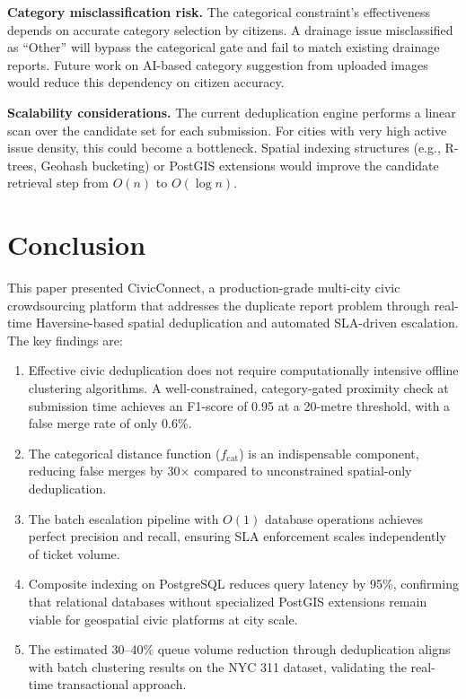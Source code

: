 \documentclass[conference]{IEEEtran}
\begin{document}
\textbf{Category misclassification risk.} The categorical constraint's effectiveness depends on accurate category selection by citizens. A drainage issue misclassified as ``Other'' will bypass the categorical gate and fail to match existing drainage reports. Future work on AI-based category suggestion from uploaded images would reduce this dependency on citizen accuracy.

\textbf{Scalability considerations.} The current deduplication engine performs a linear scan over the candidate set for each submission. For cities with very high active issue density, this could become a bottleneck. Spatial indexing structures (e.g., R-trees, Geohash bucketing) or PostGIS extensions would improve the candidate retrieval step from $O(n)$ to $O(\log n)$.

\section{Conclusion}

This paper presented CivicConnect, a production-grade multi-city civic crowdsourcing platform that addresses the duplicate report problem through real-time Haversine-based spatial deduplication and automated SLA-driven escalation. The key findings are:

\begin{enumerate}
\item Effective civic deduplication does not require computationally intensive offline clustering algorithms. A well-constrained, category-gated proximity check at submission time achieves an F1-score of 0.95 at a 20-metre threshold, with a false merge rate of only 0.6\%.
\item The categorical distance function ($f_{\text{cat}}$) is an indispensable component, reducing false merges by 30$\times$ compared to unconstrained spatial-only deduplication.
\item The batch escalation pipeline with $O(1)$ database operations achieves perfect precision and recall, ensuring SLA enforcement scales independently of ticket volume.
\item Composite indexing on PostgreSQL reduces query latency by 95\%, confirming that relational databases without specialized PostGIS extensions remain viable for geospatial civic platforms at city scale.
\item The estimated 30--40\% queue volume reduction through deduplication aligns with batch clustering results on the NYC 311 dataset, validating the real-time transactional approach.
\end{enumerate}
\end{document}

